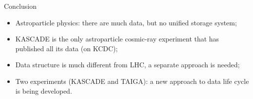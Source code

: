 \begin{frame}{Conclusion}
\begin{itemize}
  \item Astroparticle physics: there are much data, but no unified storage system;
  \item KASCADE is the only astroparticle cosmic-ray experiment that has published all its data (on KCDC);
  \item Data structure is much different from LHC, a separate approach is needed;
  \item Two experiments (KASCADE and TAIGA): a new approach to data life cycle is being developed.
\end{itemize}
\end{frame}

%
